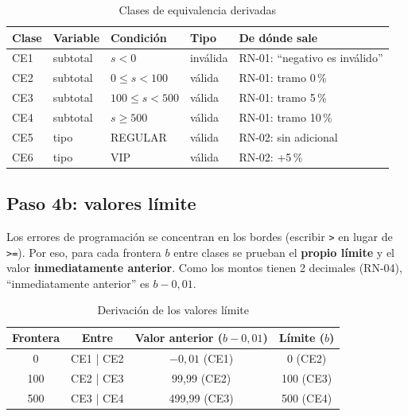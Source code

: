 \documentclass[11pt,a4paper,oneside]{report}
\newcommand{\code}[1]{\texttt{#1}}
\begin{document}
\begin{table}[H]
\centering
\caption{Clases de equivalencia derivadas}
\small
\begin{tabular}{llllp{4cm}}
\toprule
\textbf{Clase} & \textbf{Variable} & \textbf{Condición} & \textbf{Tipo} & \textbf{De dónde sale}\\
\midrule
CE1 & subtotal & $s < 0$ & inválida & RN-01: ``negativo es inválido''\\
CE2 & subtotal & $0 \leq s < 100$ & válida & RN-01: tramo 0\,\%\\
CE3 & subtotal & $100 \leq s < 500$ & válida & RN-01: tramo 5\,\%\\
CE4 & subtotal & $s \geq 500$ & válida & RN-01: tramo 10\,\%\\
CE5 & tipo & REGULAR & válida & RN-02: sin adicional\\
CE6 & tipo & VIP & válida & RN-02: +5\,\%\\
\bottomrule
\end{tabular}
\end{table}

\subsection{Paso 4b: valores límite}
Los errores de programación se concentran en los bordes (escribir \code{>} en lugar de \code{>=}). Por eso, para cada frontera $b$ entre clases se prueban el \textbf{propio límite} y el valor \textbf{inmediatamente anterior}. Como los montos tienen 2 decimales (RN-04), ``inmediatamente anterior'' es $b - 0{,}01$.

\begin{table}[H]
\centering
\caption{Derivación de los valores límite}
\small
\begin{tabular}{cccc}
\toprule
\textbf{Frontera} & \textbf{Entre} & \textbf{Valor anterior ($b-0{,}01$)} & \textbf{Límite ($b$)}\\
\midrule
0 & CE1 | CE2 & $-0{,}01$ (CE1) & 0 (CE2)\\
100 & CE2 | CE3 & 99,99 (CE2) & 100 (CE3)\\
500 & CE3 | CE4 & 499,99 (CE3) & 500 (CE4)\\
\bottomrule
\end{tabular}
\end{table}
\end{document}
